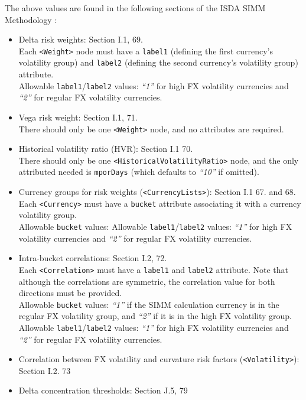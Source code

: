 The above values are found in the following sections of the ISDA SIMM Methodology \cite{SIMM2.5A}:
\begin{itemize}
  \item Delta risk weights: Section I.1, 69. \\
    Each {\tt <Weight>} node must have a {\tt label1} (defining the first currency's volatility group) and {\tt label2}
    (defining the second currency's volatility group) attribute. \\
    Allowable {\tt label1}/{\tt label2} values: \emph{``1''} for high FX volatility currencies and \emph{``2''}
    for regular FX volatility currencies.
  \item Vega risk weight: Section I.1, 71. \\
    There should only be one {\tt <Weight>} node, and no attributes are required.
  \item Historical volatility ratio (HVR): Section I.1 70. \\
    There should only be one {\tt <HistoricalVolatilityRatio>} node, and the only attributed needed is {\tt mporDays}
    (which defaults to \emph{``10''} if omitted).
  \item Currency groups for risk weights ({\tt <CurrencyLists>}): Section I.1 67. and 68. \\
    Each {\tt <Currency>} must have a {\tt bucket} attribute associating it with a currency volatility group. \\
    Allowable {\tt bucket} values: Allowable {\tt label1}/{\tt label2} values: \emph{``1''} for high FX volatility
    currencies and \emph{``2''} for regular FX volatility currencies.
  \item Intra-bucket correlations: Section I.2, 72. \\
    Each {\tt <Correlation>} must have a {\tt label1} and {\tt label2} attribute. Note that although the correlations
    are symmetric, the correlation value for both directions must be provided. \\
    Allowable {\tt bucket} values: \emph{``1''} if the SIMM calculation currency is in the regular FX volatility group, and \emph{``2''} if it is in the high FX volatility group. \\
    Allowable {\tt label1}/{\tt label2} values: \emph{``1''} for high FX volatility currencies and \emph{``2''}
    for regular FX volatility currencies.
  \item Correlation between FX volatility and curvature risk factors ({\tt <Volatility>}): Section I.2. 73
  \item Delta concentration thresholds: Section J.5, 79 \\

\end{itemize}
